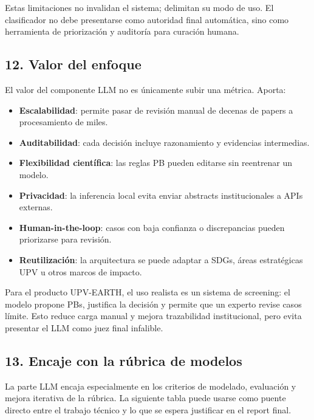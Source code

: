 Estas limitaciones no invalidan el sistema; delimitan su modo de uso. El clasificador no debe presentarse como autoridad final automática, sino como herramienta de priorización y auditoría para curación humana.

\subsection{12. Valor del enfoque}

El valor del componente LLM no es únicamente subir una métrica. Aporta:

\begin{itemize}
\item \textbf{Escalabilidad}: permite pasar de revisión manual de decenas de papers a procesamiento de miles.
\item \textbf{Auditabilidad}: cada decisión incluye razonamiento y evidencias intermedias.
\item \textbf{Flexibilidad científica}: las reglas PB pueden editarse sin reentrenar un modelo.
\item \textbf{Privacidad}: la inferencia local evita enviar abstracts institucionales a APIs externas.
\item \textbf{Human-in-the-loop}: casos con baja confianza o discrepancias pueden priorizarse para revisión.
\item \textbf{Reutilización}: la arquitectura se puede adaptar a SDGs, áreas estratégicas UPV u otros marcos de impacto.
\end{itemize}

Para el producto UPV-EARTH, el uso realista es un sistema de screening: el modelo propone PBs, justifica la decisión y permite que un experto revise casos límite. Esto reduce carga manual y mejora trazabilidad institucional, pero evita presentar el LLM como juez final infalible.

\subsection{13. Encaje con la rúbrica de modelos}

La parte LLM encaja especialmente en los criterios de modelado, evaluación y mejora iterativa de la rúbrica. La siguiente tabla puede usarse como puente directo entre el trabajo técnico y lo que se espera justificar en el report final.

